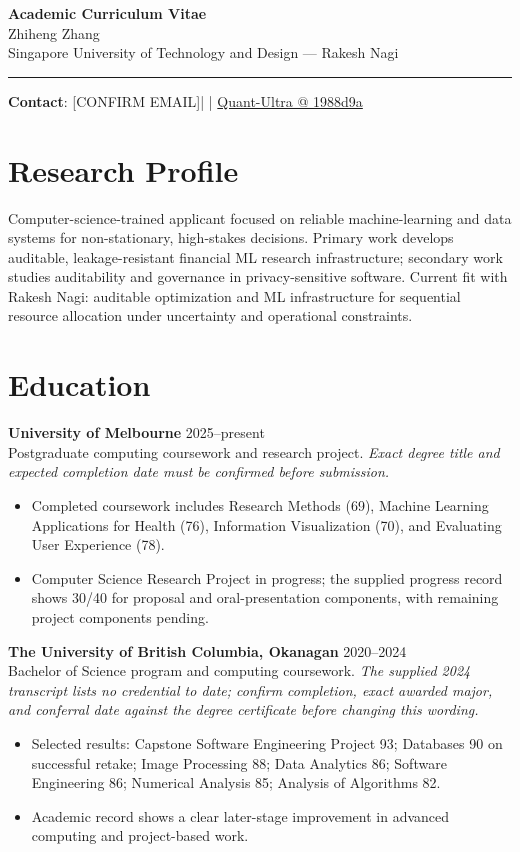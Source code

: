 \documentclass[11pt]{article}
\makeatletter
\newcommand{\ApplicantName}{Zhiheng Zhang}
\newcommand{\ApplicantEmail}{[CONFIRM EMAIL]}
\newcommand{\ApplicantPhone}{[CONFIRM PHONE]}
\newcommand{\ApplicantGitHub}{\href{https://github.com/zhiheng-zhang-Mera/Quant-Ultra/tree/1988d9a8530da91a8158de864d098ea869098923}{Quant-Ultra @ 1988d9a}}
\makeatother
\begin{document}
\begin{center}
{\LARGE\bfseries Academic Curriculum Vitae}\\[0.25em]
{\large \ApplicantName}\\
Singapore University of Technology and Design --- Rakesh Nagi
\end{center}
\vspace{0.35em}\hrule\vspace{0.65em}

\textbf{Contact}: \ApplicantEmail\quad | \quad \ApplicantPhone\quad | \quad \ApplicantGitHub

\section*{Research Profile}
Computer-science-trained applicant focused on reliable machine-learning and data systems for non-stationary, high-stakes decisions. Primary work develops auditable, leakage-resistant financial ML research infrastructure; secondary work studies auditability and governance in privacy-sensitive software. Current fit with Rakesh Nagi: auditable optimization and ML infrastructure for sequential resource allocation under uncertainty and operational constraints.

\section*{Education}
\textbf{University of Melbourne} \hfill 2025--present\\
Postgraduate computing coursework and research project. \textit{Exact degree title and expected completion date must be confirmed before submission.}
\begin{itemize}
\item Completed coursework includes Research Methods (69), Machine Learning Applications for Health (76), Information Visualization (70), and Evaluating User Experience (78).
\item Computer Science Research Project in progress; the supplied progress record shows 30/40 for proposal and oral-presentation components, with remaining project components pending.
\end{itemize}

\textbf{The University of British Columbia, Okanagan} \hfill 2020--2024\\
Bachelor of Science program and computing coursework. \textit{The supplied 2024 transcript lists no credential to date; confirm completion, exact awarded major, and conferral date against the degree certificate before changing this wording.}
\begin{itemize}
\item Selected results: Capstone Software Engineering Project 93; Databases 90 on successful retake; Image Processing 88; Data Analytics 86; Software Engineering 86; Numerical Analysis 85; Analysis of Algorithms 82.
\item Academic record shows a clear later-stage improvement in advanced computing and project-based work.
\end{itemize}
\end{document}

